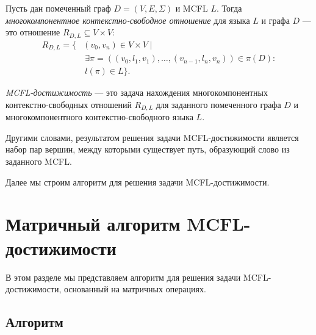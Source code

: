 \begin{definition}
	Пусть дан помеченный граф $D = (V, E, \Sigma)$ и MCFL $L$. Тогда \emph{многокомпонентное контекстно-свободное отношение} для языка $L$ и графа $D$ --- это отношение $R_{D, L} \subseteq V \times V$:
	\begin{equation*} \label{eq1}
		\begin{split}
			R_{D, L} = \{ &(v_0, v_n) \in V \times V  \mid \\ &\ \exists \pi = ((v_0, l_1, v_1), \ldots, (v_{n-1}, l_n, v_n)) \in \pi(D): \\
			&\ l(\pi) \in L \}.
		\end{split}
	\end{equation*}
\end{definition}

\begin{definition}
	\emph{MCFL-достижимость} --- это задача нахождения  многокомпонентных контекстно-свободных отношений $R_{D, L}$ для заданного помеченного графа $D$ и многокомпонентного контекстно-свободного языка $L$.
\end{definition}

Другими словами, результатом решения задачи MCFL-достижимости является набор пар вершин, между которыми существует путь, образующий слово из заданного MCFL.

Далее мы строим алгоритм для решения задачи MCFL-достижимости.

\section{Матричный алгоритм MCFL-достижимости}
\label{sec:all-path-algo}
В этом разделе мы представляем алгоритм для решения задачи MCFL-достижимости, основанный на матричных операциях.

\subsection{Алгоритм}

